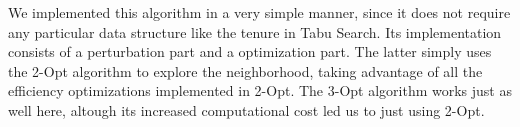 We implemented this algorithm in a very simple manner, since it does not require any particular data structure like the tenure in Tabu Search.
Its implementation consists of a perturbation part and a optimization part.
The latter simply uses the 2-Opt algorithm to explore the neighborhood, taking advantage of all the efficiency optimizations implemented in 2-Opt.
The 3-Opt algorithm works just as well here, altough its increased computational cost led us to just using 2-Opt.



